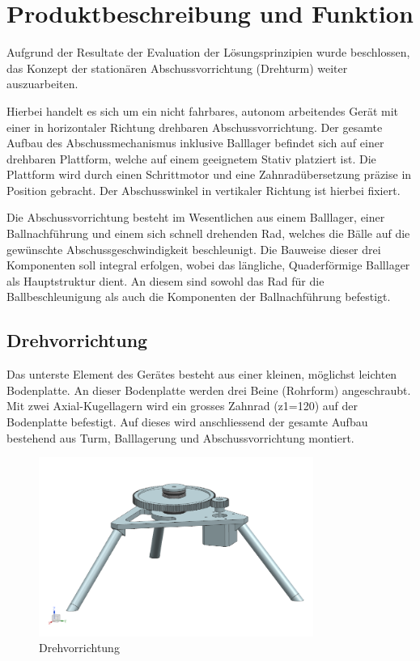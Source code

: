 \section{Produktbeschreibung und Funktion}

Aufgrund der Resultate der Evaluation der Lösungsprinzipien wurde beschlossen, 
das Konzept der stationären Abschussvorrichtung (Drehturm) weiter 
auszuarbeiten. 

Hierbei handelt es sich um ein nicht fahrbares, autonom arbeitendes Gerät mit 
einer in horizontaler Richtung drehbaren Abschussvorrichtung. Der gesamte Aufbau 
des Abschussmechanismus inklusive Balllager befindet sich auf einer drehbaren 
Plattform, welche auf einem geeignetem Stativ platziert ist. Die Plattform 
wird durch einen Schrittmotor und eine Zahnradübersetzung präzise in Position 
gebracht. Der Abschusswinkel in vertikaler Richtung ist hierbei fixiert. 

Die Abschussvorrichtung besteht im Wesentlichen aus einem Balllager, einer 
Ballnachführung und einem sich schnell drehenden Rad, welches die Bälle auf 
die gewünschte Abschussgeschwindigkeit beschleunigt. Die Bauweise dieser drei 
Komponenten soll integral erfolgen, wobei das längliche, Quaderförmige 
Balllager als Hauptstruktur dient. An diesem sind sowohl das Rad für die 
Ballbeschleunigung als auch die Komponenten der Ballnachführung befestigt.

\subsection{Drehvorrichtung}
Das unterste Element des Gerätes besteht aus einer kleinen, möglichst leichten 
Bodenplatte. An dieser Bodenplatte werden drei Beine (Rohrform) angeschraubt. Mit 
zwei Axial-Kugellagern wird ein grosses Zahnrad (z1=120) auf der Bodenplatte 
befestigt. Auf dieses wird anschliessend der gesamte Aufbau bestehend aus Turm, Balllagerung und Abschussvorrichtung montiert. 

\begin{figure}[h!]          
	\centering             
	\includegraphics[width=0.8\textwidth]{fig/Bild_Drehturm.png}    
	\caption{Drehvorrichtung}
	
	\label{fig:bild}        %
\end{figure}

